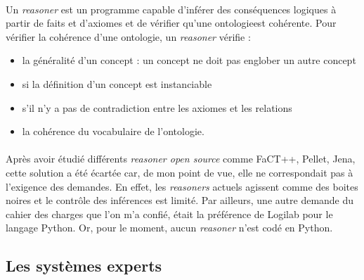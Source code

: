 \documentclass {report}
\begin{document}
\paragraph{}
Un \textit{reasoner} est un programme capable d'inférer des conséquences logiques à partir de faits et d'axiomes et de vérifier qu'une ontologie\footnotemark[1] est cohérente. Pour vérifier la cohérence d'une ontologie, un \textit{reasoner} vérifie : 
\begin{itemize}
\item la généralité d'un concept : un concept ne doit pas englober un autre concept
\item si la définition d'un concept est instanciable
\item s'il n'y a pas de contradiction entre les axiomes et les relations
\item la cohérence du vocabulaire de l'ontologie.
\end{itemize}
\paragraph{}
Après avoir étudié différents \textit{reasoner open source} comme FaCT++, Pellet, Jena, cette solution a été écartée car, de mon point de vue, elle ne correspondait pas à l'exigence des demandes. En effet, les \textit{reasoners} actuels agissent comme des boites noires et le contrôle des inférences est limité. Par ailleurs, une autre demande du cahier des charges que l'on m'a confié, était la préférence de Logilab pour le langage Python. Or, pour le moment, aucun \textit{reasoner} n'est codé en Python.


    

\subsection{Les systèmes experts}
\end{document}
